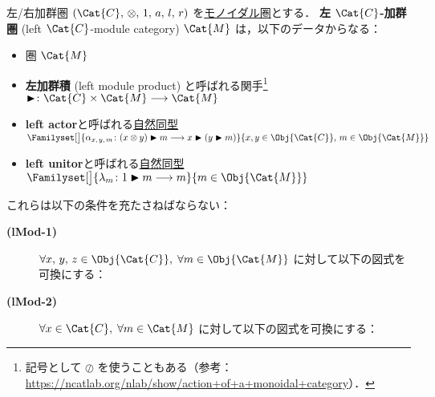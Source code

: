 \documentclass[TQFT_main]{subfiles}
\begin{document}
\begin{mydef}[label=def:modulecat,breakable]{左/右加群圏}
    $(\Cat{C},\, \otimes,\, 1,\, a,\, l,\, r)$ を\hyperref[redef:monoidal-category]{モノイダル圏}とする．
    \textbf{左 $\Cat{C}$-加群圏} (left $\Cat{C}$-module category) $\Cat{M}$ は，以下のデータからなる：
    \begin{itemize}
        \item 圏 $\Cat{M}$
        \item \textbf{左加群積} (left module product) と呼ばれる関手\footnote{記号として $\oslash$ を使うこともある（参考：\url{https://ncatlab.org/nlab/show/action+of+a+monoidal+category}）．} $\btr \colon \Cat{C} \times \Cat{M} \lto \Cat{M}$
        \item \textbf{left actor}と呼ばれる\hyperref[def:nat]{自然同型} $\Familyset[\big]{\alpha_{x,\, y,\, m} \colon (x \otimes y) \btr m \lto x \btr (y \btr m)}{x,y \in \Obj{\Cat{C}},\, m \in \Obj{\Cat{M}}}$
        \item \textbf{left unitor}と呼ばれる\hyperref[def:nat]{自然同型} $\Familyset[\big]{\lambda_{m} \colon 1 \btr m \lto m}{m \in \Obj{\Cat{M}}}$
    \end{itemize}
    これらは以下の条件を充たさねばならない：
    \begin{description}
        \item[\textbf{(lMod-1)}] $\forall x,\,y,\, z \in \Obj{\Cat{C}},\; \forall m \in \Obj{\Cat{M}}$ に対して以下の図式を可換にする：
        \begin{flushleft}
        \end{flushleft}
        \item[\textbf{(lMod-2)}] $\forall x \in \Cat{C},\; \forall m \in \Cat{M}$ に対して以下の図式を可換にする：
        \begin{center}
        \end{center}
        

\end{description}
\end{mydef}
\end{document}
